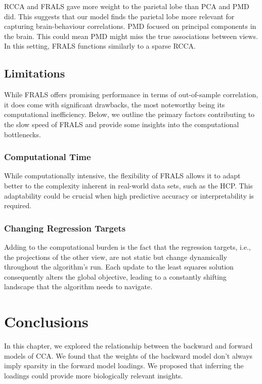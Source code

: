 RCCA and FRALS gave more weight to the parietal lobe than PCA and PMD did.
This suggests that our model finds the parietal lobe more relevant for capturing brain-behaviour correlations.
PMD focused on principal components in the brain.
This could mean PMD might miss the true associations between views.
In this setting, FRALS functions similarly to a sparse RCCA.

\subsection{Limitations}
While FRALS offers promising performance in terms of out-of-sample correlation, it does come with significant drawbacks, the most noteworthy being its computational inefficiency.
Below, we outline the primary factors contributing to the slow speed of FRALS and provide some insights into the computational bottlenecks.

\subsubsection{Computational Time}\label{subsec:computational-time}
While computationally intensive, the flexibility of FRALS allows it to adapt better to the complexity inherent in real-world data sets, such as the HCP. This adaptability could be crucial when high predictive accuracy or interpretability is required.

\subsubsection{Changing Regression Targets}\label{subsec:changing-regression-targets}
Adding to the computational burden is the fact that the regression targets, i.e., the projections of the other view, are not static but change dynamically throughout the algorithm's run.
Each update to the least squares solution consequently alters the global objective, leading to a constantly shifting landscape that the algorithm needs to navigate.

\section{Conclusions}
In this chapter, we explored the relationship between the backward and forward models of CCA. We found that the weights of the backward model don't always imply sparsity in the forward model loadings. We proposed that inferring the loadings could provide more biologically relevant insights.

